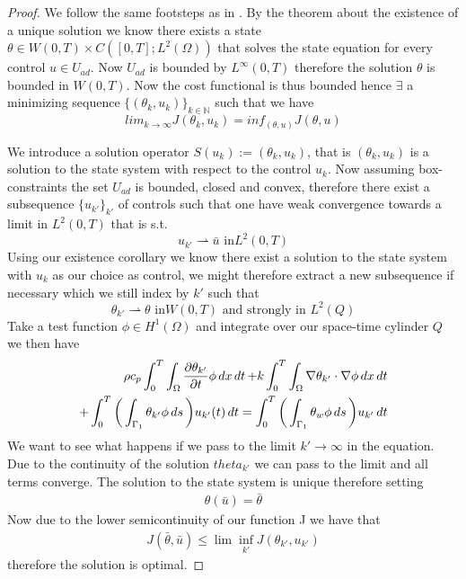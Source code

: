\begin{proof}
We follow the same footsteps as in  \cite{DPSteel}. By the theorem about the existence of a unique solution we know there exists a state $\theta \in W(0,T) \times C([0,T];L^2(\Omega))$ that solves the state equation for every control $u \in U_{ad}$. Now $U_{ad}$ is bounded by $L^{\infty}(0,T)$ therefore the solution $\theta$ is bounded in $W(0,T)$. Now the cost functional is thus bounded hence $\exists$ a minimizing sequence $\{(\theta_k,u_k)\}_{k\in \mathbb{N}}$ such that we have 
\begin{equation*}
    lim_{k\rightarrow \infty}J(\theta_k,u_k) = inf_{(\theta,u)}J(\theta,u)
\end{equation*}

We introduce a solution operator $S(u_k):= (\theta_k, u_k)$, that is $(\theta_k,u_k)$ is a solution to the state system with respect to the control $u_k$. Now assuming box-constraints the set $U_{ad}$ is bounded, closed and convex, therefore there exist a subsequence $\{u_{k'} \}_{k'}$ of controls such that one have weak convergence towards a limit in $L^2(0,T)$ that is s.t.
\begin{equation*}
    u_{k'} \rightharpoonup \bar{u} \text{ in} L^2(0,T)
\end{equation*}
Using our existence corollary we know there exist a solution to the state system with $u_k$ as our choice as control, we might therefore extract a new subsequence if necessary which we still index by $k'$ such that
\begin{equation*}
    \theta_{k'} \rightharpoonup \theta \text{ in} W(0,T) \text{ and strongly in } L^2(Q)
\end{equation*}
Take a test function $\phi \in H^1(\Omega)$ and integrate over our space-time cylinder $Q$ we then have 
\begin{align*}
    \rho c_p \int_0^T\int_{\Omega}\frac{\partial \theta_{k'}}{\partial t}\phi \mathop{dx}\mathop{dt} + k \int_0^T \int_{\Omega}\nabla \theta_{k'} \cdot \nabla \phi \mathop{dx}\mathop{dt} \\ + \int_0^T \bigg (\int_{\Gamma_1}\theta_{k'}\phi \mathop{ds} \bigg )u_{k'}(t) \mathop{dt} =
    \int_0^T \bigg (\int_{\Gamma_1}\theta_w\phi \mathop{ds} \bigg ) u_{k'} \mathop{dt} 
\end{align*}
We want to see what happens if we pass to the limit $k' \rightarrow \infty$ in the equation. Due to the continuity of the solution $theta_{k'}$ we can pass to the limit and all terms converge. The solution to the state system is unique therefore setting
\begin{align*}
    \theta(\bar{u}) = \bar{\theta} 
\end{align*}
Now due to the lower semicontinuity of our function J we have that 
\begin{align*}
    J(\bar{\theta}, \bar{u}) \leq \lim \inf_{k'} J(\theta_{k'}, u_{k'})
\end{align*}
therefore the solution is optimal. 
\end{proof}
